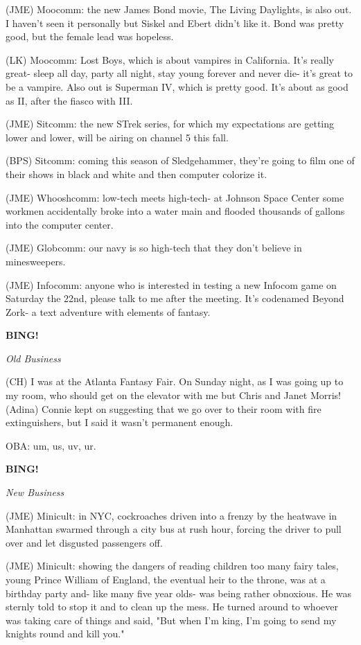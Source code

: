 \documentclass[12pt]{article}
\newcommand{\bing}{{\bf BING!} }
\newcommand{\goto}[1]{\bing \vskip 12pt \centerline{{\em{#1}}}}
\begin{document}
(JME) Moocomm: the new James Bond movie, The Living Daylights, is also out. I haven't seen it personally but Siskel and Ebert didn't like it. Bond was pretty good, but the female lead was hopeless.

(LK) Moocomm: Lost Boys, which is about vampires in California. It's really great- sleep all day, party all night, stay young forever and never die- it's great to be a vampire. Also out is Superman IV, which is pretty good. It's about as good as II, after the fiasco with III.

(JME) Sitcomm: the new STrek series, for which my expectations are getting lower and lower, will be airing on channel 5 this fall.

(BPS) Sitcomm: coming this season of Sledgehammer, they're going to film one of their shows in black and white and then computer colorize it.

(JME) Whooshcomm: low-tech meets high-tech- at Johnson Space  Center some workmen accidentally broke into a water main and flooded thousands of gallons into the computer center.

(JME) Globcomm: our navy is so high-tech that they don't believe in minesweepers.

(JME) Infocomm: anyone who is interested in testing a new Infocom game on Saturday the 22nd, please talk to me after the meeting. It's codenamed Beyond Zork- a text adventure with elements of fantasy.

\goto{Old Business}

(CH) I was at the Atlanta Fantasy Fair. On Sunday night, as I was going up to my room, who should get on the elevator with me but Chris and Janet Morris! (Adina) Connie kept on suggesting that we go over to their room with fire extinguishers, but I said it wasn't permanent enough.

OBA: um, us, uv, ur.

\goto{New Business}

(JME) Minicult: in NYC, cockroaches driven into a frenzy by the heatwave in Manhattan swarmed through a city bus at rush hour, forcing the driver to pull over and let disgusted passengers off.

(JME) Minicult: showing the dangers of reading children too many fairy tales, young Prince William of England, the eventual heir to the throne, was at a birthday party and- like many five year olds- was being rather obnoxious. He was sternly told to stop it and to clean up the mess. He turned around to whoever was taking care of things and said, "But when I'm king, I'm going to send my knights round and kill you."
\end{document}
